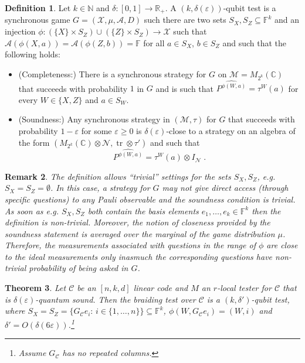 \documentclass[11pt]{article}
\newtheorem{theorem}{Theorem}[section]
\newtheorem{remark}[theorem]{Remark}
\theoremstyle{definition}
\newtheorem{definition}[theorem]{Definition}
\newcommand{\code}{\mathcal{C}}
\newcommand{\Id}{\ensuremath{I}}
\newcommand{\field}{\mathbb{F}}
\newcommand{\C}{\ensuremath{\mathbb{C}}}
\newcommand{\N}{\ensuremath{\mathbb{N}}}
\newcommand{\R}{\ensuremath{\mathbb{R}}}
\newcommand{\mA}{\ensuremath{\mathcal{A}}}
\newcommand{\mM}{\ensuremath{\mathcal{M}}}
\newcommand{\mX}{\ensuremath{\mathcal{X}}}
\newcommand{\eps}{\varepsilon}
\newcommand{\mN}{\mathcal{N}}
\DeclareMathOperator{\tr}{tr}
\begin{document}
\begin{definition}
Let $k\in \N$ and $\delta:[0,1]\to\R_+$. 
A $(k,\delta(\eps))$-qubit test is a synchronous game $G=(\mX,\mu,\mA,D)$ such there are two sets $S_X,S_Z\subseteq \field^k$ and an injection $\phi:(\{X\}\times S_Z) \cup (\{Z\}\times S_Z) \to \mX$ such that $\mA(\phi({X},a))=\mA(\phi({Z},b))=\field$ for all $a\in S_X$, $b\in S_Z$ and such that the following holds:
\begin{itemize}
\item (Completeness:) There is a synchronous strategy for $G$ on $\mM=M_{2^{k}}(\C)$ that succeeds with probability $1$ in $G$ and is such that $\widehat{P^{\phi({W},a)}} = \tau^W(a)$ for every $W\in\{X,Z\}$ and $a\in S_W$.
\item (Soundness:) Any synchronous strategy in $(\mM,\tau)$ for $G$ that succeeds with probability $1-\eps$ for some $\eps\geq 0$ is $\delta(\eps)$-close to a strategy on an algebra of the form $(M_{2^{k}}(\C)\otimes \mN,\tr\otimes \tau')$ and such that
\[\widehat{P^{\phi({W},a)}} = \tau^W(a)\otimes \Id_\mN\;.\]
\end{itemize}
\end{definition}

\begin{remark}
The definition allows ``trivial'' settings for the sets $S_X,S_Z$, e.g.\ $S_X=S_Z=\emptyset$. In this case, a strategy for $G$ may not give direct access (through specific questions) to any Pauli observable and the soundness condition is trivial. As soon as e.g. $S_X,S_Z$ both contain the basis elements $e_1,\ldots,e_k \in \field^k$ then the definition is non-trivial. Moreover, the notion of closeness provided by the soundness statement is averaged over the marginal of the game distribution $\mu$. Therefore, the measurements associated with questions in the range of $\phi$ are close to the ideal measurements only inasmuch the corresponding questions have non-trivial probability of being asked in $G$. 
\end{remark}

\begin{theorem}
Let $\code$ be an $[n,k,d]$ linear code and $M$ an $r$-local tester for $\code$ that is $\delta(\eps)$-quantum sound. Then the braiding test over $\code$ is a $(k,\delta')$-qubit test, where $S_X=S_Z=\{G_\code e_i:\,i\in\{1,\ldots,n\}\}\subseteq \field^k$, $\phi(W,G_\code e_i)=(W,i)$ and $\delta' = O(\delta(6\eps))$.\footnote{Assume $G_\code$ has no repeated columns.} 
\end{theorem}
\end{document}
